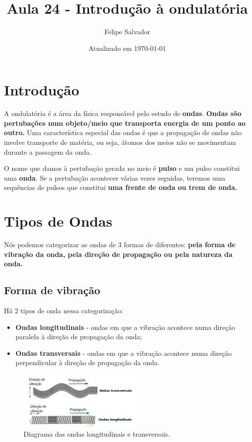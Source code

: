 \documentclass[12pt]{extarticle}
\title{Aula 24 - Introdução à ondulatória}
\author{Felipe Salvador}
\date{Atualizado em \today}
\newcommand{\<}{\langle}
\renewcommand{\>}{\rangle}
\theoremstyle{definition}
\begin{document}
\maketitle

\section{Introdução}
A ondulatória é a área da física responsável pelo estudo de \textbf{ondas}. \textbf{Ondas são pertubações num objeto/meio que transporta energia de um ponto ao outro.} Uma característica especial das ondas é que a propagação de ondas não involve transporte de matéria, ou seja, átomos dos meios não se movimentam durante a passagem da onda.

O nome que damos à pertubação gerada no meio é \textbf{pulso} e um pulso constitui uma \textbf{onda}. Se a pertubação acontecer várias vezes seguidas, teremos uma sequências de pulsos que constitui \textbf{uma frente de onda ou trem de onda.}

\section{Tipos de Ondas}
Nós podemos categorizar as ondas de 3 formas de diferentes: \textbf{pela forma de vibração da onda, pela direção de propagação ou pela natureza da onda.}

\subsection{Forma de vibração}
Há 2 tipos de onda nessa categorização:
\begin{itemize}
    \item \textbf{Ondas longitudinais} - ondas em que a vibração acontece numa direção paralela à direção de propagação da onda;
    \item \textbf{Ondas transversais} - ondas em que a vibração acontece numa direção perpendicular à direção de propagação da onda.
\end{itemize}
\begin{figure}[H]
    \centering
    \includegraphics[width=0.55\textwidth]{ondas_longitudinais_transversais.png}
    \caption{Diagrama das ondas longitudinais e transversais.}
    \label{fig:longitudinal_transversal}
\end{figure}
\end{document}
